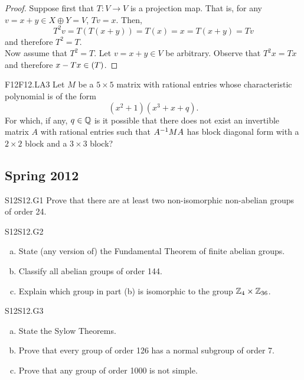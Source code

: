 \documentclass[../AlgebraQualSolutions.tex]{subfiles}
\begin{document}
	\begin{proof}
		Suppose first that $T: V \to V$ is a projection map. That is, for any $v = x + y \in X \oplus Y = V$, $Tv = x$. Then,
			\[T^2v = T(T(x+y)) = T(x) = x = T(x+y) = Tv\]
		and therefore $T^2 = T$.\\

		Now assume that $T^2=T$. Let $v = x+y \in V$ be arbitrary. Observe that $T^2 x = Tx$ and therefore $x - Tx \in \null(T)$.
	\end{proof}
	
	\begin{prob}{F12}{F12.LA3}
	Let $M$ be a $5 \times 5$ matrix with rational entries whose characteristic polynomial is of the form
		\[(x^2+1)(x^3+x+q).\]
	For which, if any, $q \in \mathbb{Q}$ is it possible that there does not exist an invertible matrix $A$ with rational entries such that $A^{-1} M A$ has block diagonal form with a $2 \times 2$ block and a $3 \times 3$ block?
	\end{prob}
	
	\subsection{Spring 2012}


	\begin{prob}{S12}{S12.G1}
		Prove that there are at least two non-isomorphic non-abelian groups of order 24.
	\end{prob}

	\begin{prob}{S12}{S12.G2}
		\begin{enumerate}[(a)]
			\item State (any version of) the Fundamental Theorem of finite abelian groups.
			\item Classify all abelian groups of order 144.
			\item Explain which group in part (b) is isomorphic to the group $\mathbb{Z}_4 \times \mathbb{Z}_{36}$.
		\end{enumerate}
	\end{prob}

	\begin{prob}{S12}{S12.G3}
		\begin{enumerate}[(a)]
			\item State the Sylow Theorems.
			\item Prove that every group of order 126 has a normal subgroup of order 7.
			\item Prove that any group of order 1000 is not simple.
		\end{enumerate}
	\end{prob}
\end{document}
